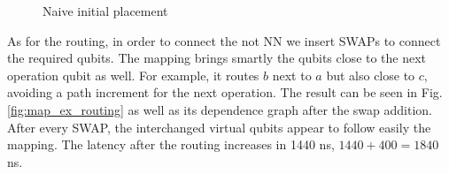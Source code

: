 \begin{figure}[H]
\centering
{}


\label{fig:map_ex_wrong_init}
\caption{Naive initial placement}
\end{figure}
As for the routing, in order to connect the not NN we insert SWAPs to connect the required qubits.
The mapping brings smartly the qubits close to the next operation qubit as well.
For example, it routes \(b\) next to \(a\) but also close to \(c\), avoiding a path increment for the next operation.
The result can be seen in Fig. \ref{fig:map_ex_routing} as well as its dependence graph after the swap addition.
After every SWAP, the interchanged virtual qubits appear to follow easily the mapping.
The latency after the routing increases in 1440 ns, \(1440 + 400 = 1840\) ns.


